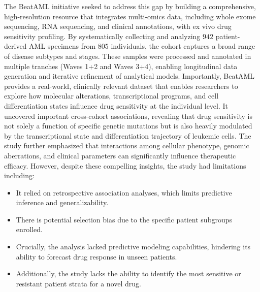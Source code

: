 \documentclass[pdflatex,sn-mathphys-num]{sn-jnl}%
\theoremstyle{thmstyleone}%
\theoremstyle{thmstyletwo}%
\theoremstyle{thmstylethree}%
\begin{document}
The BeatAML initiative \cite{bottomly2022integrative} seeked to address this gap by building a comprehensive, high-resolution resource that integrates multi-omics data, including whole exome sequencing, RNA sequencing, and clinical annotations, with ex vivo drug sensitivity profiling. By systematically collecting and analyzing $942$ patient-derived AML specimens from $805$ individuals, the cohort captures a broad range of disease subtypes and stages. These samples were processed and annotated in multiple tranches (Waves 1+2 and Waves 3+4), enabling longitudinal data generation and iterative refinement of analytical models. Importantly, BeatAML provides a real-world, clinically relevant dataset that enables researchers to explore how molecular alterations, transcriptional programs, and cell differentiation states influence drug sensitivity at the individual level. It uncovered important cross-cohort associations, revealing that drug sensitivity is not solely a function of specific genetic mutations but is also heavily modulated by the transcriptional state and differentiation trajectory of leukemic cells. The study further emphasized that interactions among cellular phenotype, genomic aberrations, and clinical parameters can significantly influence therapeutic efficacy.
However, despite these compelling insights, the study \cite{bottomly2022integrative} had limitations including:
\begin{itemize}
    \item It relied on retrospective association analyses, which limits predictive inference and generalizability.
    \item There is potential selection bias due to the specific patient subgroups enrolled.
    \item Crucially, the analysis lacked predictive modeling capabilities, hindering its ability to forecast drug response in unseen patients.
    \item Additionally, the study lacks the ability to identify the most sensitive or resistant patient strata for a novel drug.
\end{itemize}
\end{document}
